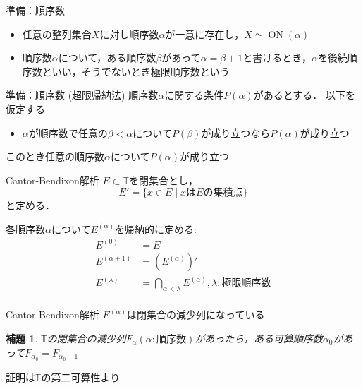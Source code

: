 \documentclass[dvipdfmx,17pt]{beamer}
\theoremstyle{plain}
\newtheorem{lem}{補題}
\newcommand{\Q}{\mathbb{Q}}
\newcommand{\R}{\mathbb{R}}
\begin{document}
\begin{frame}{準備：順序数}
\begin{itemize}
\item 任意の整列集合$X$に対し順序数$\alpha$が一意に存在し，$X \simeq \operatorname{ON}(\alpha)$
\item 順序数$\alpha$について，ある順序数$\beta$があって$\alpha = \beta + 1$と書けるとき，$\alpha$を後続順序数といい，そうでないとき極限順序数という
\end{itemize}
\end{frame}

\begin{frame}{準備：順序数 (超限帰納法)}
順序数$\alpha$に関する条件$P(\alpha)$があるとする．
以下を仮定する
\begin{itemize}
\item $\alpha$が順序数で任意の$\beta < \alpha$について$P(\beta)$が成り立つなら$P(\alpha)$が成り立つ
\end{itemize}
このとき任意の順序数$\alpha$について$P(\alpha)$が成り立つ
\end{frame}

\begin{frame}{Cantor-Bendixon解析}
$E \subset \mathbb{T}$を閉集合とし，
\[E' = \{x \in E \mid \text{$x$は$E$の集積点} \}\]
と定める．

各順序数$\alpha$について$E^{(\alpha)}$を帰納的に定める:
\begin{align*}
E^{(0)} &= E \\
E^{(\alpha + 1)} &= (E^{(\alpha)})' \\
E^{(\lambda)} &= \bigcap_{\alpha < \lambda} E^{(\alpha)}, \lambda: \text{極限順序数} \\
\end{align*}
\end{frame}

\begin{frame}{Cantor-Bendixon解析}
$E^{(\alpha)}$は閉集合の減少列になっている

\begin{lem}
$\mathbb{T}$の閉集合の減少列$F_\alpha (\alpha:\text{順序数})$があったら，ある可算順序数$\alpha_0$があって$F_{\alpha_0} = F_{\alpha_0 + 1}$
\end{lem}

\vspace{0.5cm}
証明は$\mathbb{T}$の第二可算性より
\end{frame}

\end{document}
